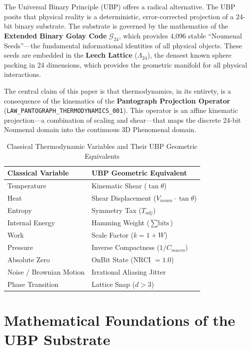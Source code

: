 \documentclass[12pt,a4paper]{article}
\begin{document}
The Universal Binary Principle (UBP) offers a radical alternative. The UBP posits that physical reality is a deterministic, error-corrected projection of a 24-bit binary substrate. The substrate is governed by the mathematics of the \textbf{Extended Binary Golay Code} $\mathcal{G}_{24}$, which provides 4,096 stable ``Noumenal Seeds''---the fundamental informational identities of all physical objects. These seeds are embedded in the \textbf{Leech Lattice} ($\Lambda_{24}$), the densest known sphere packing in 24 dimensions, which provides the geometric manifold for all physical interactions.

The central claim of this paper is that thermodynamics, in its entirety, is a consequence of the kinematics of the \textbf{Pantograph Projection Operator} (\texttt{LAW\_PANTOGRAPH\_THERMODYNAMICS\_001}). This operator is an affine kinematic projection---a combination of scaling and shear---that maps the discrete 24-bit Noumenal domain into the continuous 3D Phenomenal domain.

\begin{table}[H]
\centering
\caption{Classical Thermodynamic Variables and Their UBP Geometric Equivalents}
\begin{tabular}{@{}ll@{}}
\toprule
\textbf{Classical Variable} & \textbf{UBP Geometric Equivalent} \\
\midrule
Temperature & Kinematic Shear ($\tan \theta$) \\
Heat & Shear Displacement ($V_{noum} \cdot \tan \theta$) \\
Entropy & Symmetry Tax ($T_{adj}$) \\
Internal Energy & Hamming Weight ($\sum \text{bits}$) \\
Work & Scale Factor ($k = 1 + W$) \\
Pressure & Inverse Compactness ($1/C_{macro}$) \\
Absolute Zero & OnBit State (NRCI $= 1.0$) \\
Noise / Brownian Motion & Irrational Aliasing Jitter \\
Phase Transition & Lattice Snap ($d > 3$) \\
\bottomrule
\end{tabular}
\end{table}

\section{Mathematical Foundations of the UBP Substrate}
\end{document}
